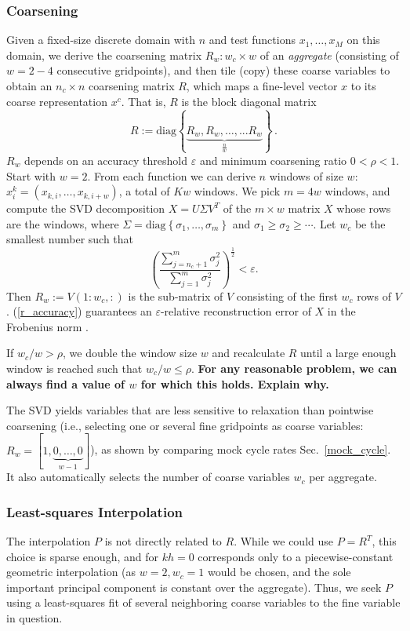 \documentclass{article}
\begin{document}
\subsubsection{Coarsening}
Given a fixed-size discrete domain with $n$ and test functions $x_1,\dots,x_M$ on this domain, we derive the coarsening matrix $R_w: w_c \times w$ of an \emph{aggregate} (consisting of $w = 2-4$ consecutive gridpoints), and then tile (copy) these coarse variables to obtain an $n_c \times n$ coarsening matrix $R$, which maps a fine-level vector $x$ to its coarse representation $x^c$. That is, $R$ is the block diagonal matrix
\begin{equation}
	R := \text{diag} \left\{ \underbrace{R_w, R_w, \dots, ... R_w }_{\frac{n}{w}}  \right\} \,.
\end{equation}
$R_w$ depends on an accuracy threshold $\varepsilon$ and minimum coarsening ratio $0 < \rho < 1$. Start with $w = 2$. From each function we can derive $n$ windows of size $w$: $x^k_i = (x_{k,i},\dots,x_{k,i+w})$, a total of $Kw$ windows. We pick $m = 4 w$ windows, and compute the SVD decomposition $X = U \Sigma V^T$ of the $m \times w$ matrix $X$ whose rows are the windows, where $\Sigma = \text{diag}\left\{\sigma_1, \dots, \sigma_m \right\}$ and $\sigma_1 \geq \sigma_2 \geq \cdots$. Let $w_c$ be the smallest number such that
\begin{equation}
	\left(\frac{\sum_{j=n_c+1}^m \sigma_j^2}{\sum_{j=1}^m \sigma_j^2 } \right)^{\frac12} < \varepsilon.
	\label{r_accuracy}
\end{equation}
Then $R_w := V(1:w_c,:)$ is the sub-matrix of $V$ consisting of the first $w_c$ rows of $V$. (\ref{r_accuracy}) guarantees an $\varepsilon$-relative reconstruction error of $X$ in the Frobenius norm \cite{svd}.

If $w_c/w > \rho$, we double the window size $w$ and recalculate $R$ until a large enough window is reached such that $w_c/w \leq \rho$. \textbf{For any reasonable problem, we can always find a value of $w$ for which this holds. Explain why.}

The SVD yields variables that are less sensitive to relaxation than pointwise coarsening (i.e., selecting one or several fine gridpoints as coarse variables: $R_w = [1,\underbrace{0,\dots,0}_{w-1}]$), as shown by comparing mock cycle rates Sec.~\ref{mock_cycle}. It also automatically selects the number of coarse variables $w_c$ per aggregate.

\subsubsection{Least-squares Interpolation}
The interpolation $P$ is not directly related to $R$. While we could use $P = R^T$, this choice is sparse enough, and for $kh=0$ corresponds only to a piecewise-constant geometric interpolation (as $w = 2, w_c = 1$ would be chosen, and the sole important principal component is constant over the aggregate). Thus, we seek $P$ using a least-squares fit of several neighboring coarse variables to the fine variable in question.
\end{document}
